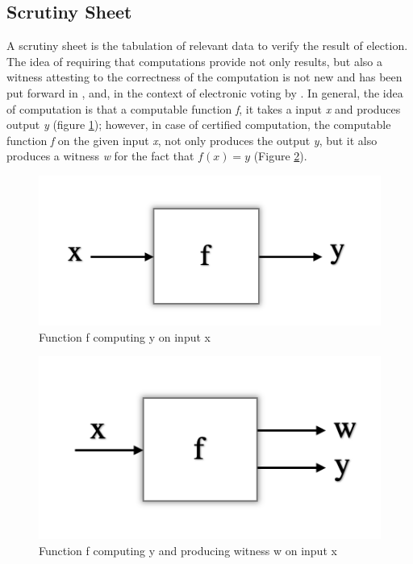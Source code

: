    \subsection{Scrutiny Sheet}
   \label{secback:scruntiny_sheet}
   A scrutiny sheet is the tabulation of relevant data to verify the result of election. 
   The idea of requiring that computations provide not only results, but also a witness attesting
    to the correctness of the computation is not new
	and has been put forward in \citep{89397}
	\citep{MCCONNELL2011119}
	\citep{Arkoudas:2005:DRC}, and, in the context of electronic voting by  \citep{Schurmann:2009:EET} \citep{Pattinson:2015:VCM}.
	 In general, the idea of computation is that a computable function \textit{f}, it takes 
	a input \textit{x} and produces output \textit{y} (figure \ref{fig:fnxy}); however, in case of
	 certified computation, 
	the computable function \textit{f} on the given input \textit{x}, not only produces the output \textit{y},
	but it also produces a witness \textit{w} for the fact that $ f (x) = y$ (Figure \ref{fig:fnxyw}).
	
	\begin{figure}[!h]
	\centering
  \includegraphics[width=0.5\linewidth]{figs/function_fx.png}
  \caption{Function f computing y on input x}
  \label{fig:fnxy}
  \end{figure} 
  
  \begin{figure}[!h]
  \centering
  \includegraphics[width=0.5\linewidth]{figs/funcxy.png}
  \caption{Function f computing y and producing witness w on input x}
  \label{fig:fnxyw}
  \end{figure} 




